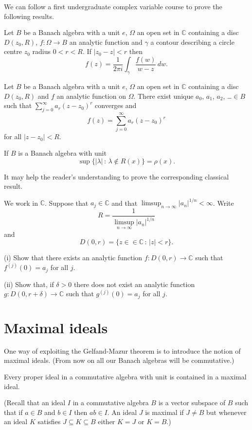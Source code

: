 We can follow a first undergraduate complex variable
course to prove the following results.
\begin{lemma} Let $B$ be a Banach algebra
with a unit $e$,
$\Omega$ an open set in ${\mathbb C}$
containing a disc $D(z_{0},R)$,
$f:\Omega\rightarrow B$ an analytic function
and $\gamma$ a contour describing a circle
centre $z_{0}$ radius $0<r<R$. If
$|z_{0}-z|<r$ then
\[f(z)=\frac{1}{2\pi i}\int_{\gamma}\frac{f(w)}{w-z}\,dw.\]
\end{lemma}
\begin{lemma} Let $B$ be a Banach algebra
with a unit $e$,
$\Omega$ an open set in ${\mathbb C}$
containing a disc $D(z_{0},R)$
and $f$ an analytic function on $\Omega$.
There exist unique $a_{0}$, $a_{1}$, $a_{2}$, \dots$\in B$
such that $\sum_{j=0}^{\infty}a_{r}(z-z_{0})^{r}$ converges and
\[f(z)=\sum_{j=0}^{\infty}a_{r}(z-z_{0})^{r}\]
for all $|z-z_{0}|<R$.
\end{lemma}
\begin{theorem} If $B$ is a Banach algebra with unit
\[\sup\{|\lambda|\,:\,\lambda\notin R(x)\}=\rho(x).\]
\end{theorem}
\begin{added}[Exercise] It may help the reader's understanding to
prove the corresponding classical result.

We work in ${\mathbb C}$. Suppose that $a_{j}\in{\mathbb C}$
and that $\limsup_{n\rightarrow\infty}|a_{n}|^{1/n}<\infty$.
Write
\[R=\frac{1}{\limsup_{n\rightarrow\infty}|a_{n}|^{1/n}}\]
and 
\[D(0,r)=\{z\in\in{\mathbb C}\,:\,|z|<r\}.\]


(i) Show that there exists an analytic function
$f:D(0,r)\rightarrow{\mathbb C}$ such that $f^{(j)}(0)=a_{j}$
for all $j$.

(ii) Show that, if $\delta>0$ there does not exist
an analytic function
$g:D(0,r+\delta)\rightarrow{\mathbb C}$ such that $g^{(j)}(0)=a_{j}$
for all $j$.
\end{added} 
\section{Maximal ideals}
One way of exploiting the Gelfand-Mazur theorem is
to introduce the notion of maximal ideals. (From
now on all our Banach algebras will be commutative.)
\begin{lemma} Every proper ideal in a commutative algebra
with unit is contained in a maximal ideal.
\end{lemma}

(Recall that an ideal $I$ in a commutative algebra
$B$ is a vector subspace of $B$ such that
if $a\in B$ and $b\in I$ then $ab\in I$.
An ideal $J$ is maximal if $J\neq B$ but
whenever an ideal $K$ satisfies $J\subseteq K\subseteq B$
either $K=J$ or $K=B$.)

